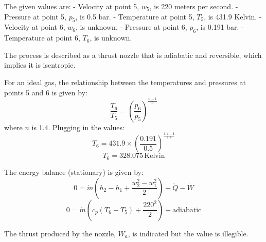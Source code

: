 The given values are:
- Velocity at point 5, \( w_5 \), is 220 meters per second.
- Pressure at point 5, \( p_5 \), is 0.5 bar.
- Temperature at point 5, \( T_5 \), is 431.9 Kelvin.
- Velocity at point 6, \( w_6 \), is unknown.
- Pressure at point 6, \( p_6 \), is 0.191 bar.
- Temperature at point 6, \( T_6 \), is unknown.

The process is described as a thrust nozzle that is adiabatic and reversible, which implies it is isentropic.

For an ideal gas, the relationship between the temperatures and pressures at points 5 and 6 is given by:
\[ \frac{T_6}{T_5} = \left( \frac{p_6}{p_5} \right)^{\frac{n-1}{n}} \]
where \( n \) is 1.4. Plugging in the values:
\[ T_6 = 431.9 \times \left( \frac{0.191}{0.5} \right)^{\frac{1.4-1}{1.4}} \]
\[ T_6 = 328.075 \, \text{Kelvin} \]

The energy balance (stationary) is given by:
\[ 0 = \dot{m} \left( h_2 - h_1 + \frac{w_2^2 - w_1^2}{2} \right) + \dot{Q} - \dot{W} \]
\[ 0 = \dot{m} \left( c_p (T_6 - T_5) + \frac{220^2}{2} \right) + \text{adiabatic} \]

The thrust produced by the nozzle, \( W_a \), is indicated but the value is illegible.